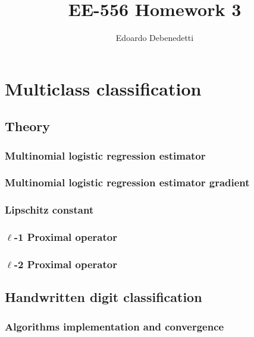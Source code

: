 \documentclass[12pt]{article}
\title{EE-556 Homework 3}
\author{Edoardo Debenedetti}
\begin{document}
\maketitle

\section{Multiclass classification}

\subsection{Theory}

\subsubsection{Multinomial logistic regression estimator}

\subsubsection{Multinomial logistic regression estimator gradient}

\subsubsection{Lipschitz constant}

\subsubsection{\texorpdfstring{$\ell$}{Lg}-1 Proximal operator}

\subsubsection{\texorpdfstring{$\ell$}{Lg}-2 Proximal operator}

\subsection{Handwritten digit classification}

\subsubsection{Algorithms implementation and convergence}
\end{document}
